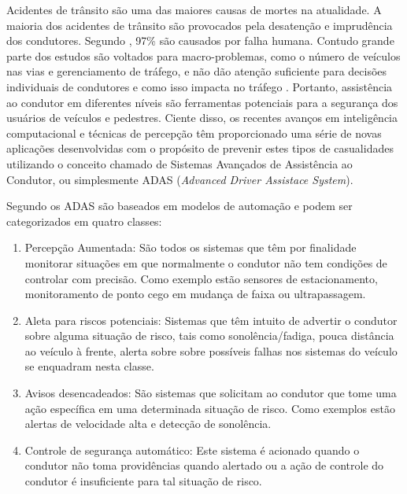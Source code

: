 Acidentes de trânsito são uma das maiores causas de mortes na atualidade. A maioria dos acidentes de trânsito são provocados pela desatenção e imprudência dos condutores. Segundo , 97\% são causados por falha humana. Contudo grande parte dos estudos são voltados para macro-problemas, como o número de veículos nas vias e gerenciamento de tráfego, e não dão atenção suficiente para decisões individuais de condutores e como isso impacta no tráfego \cite{Carmona2015}. 
Portanto, assistência ao condutor em diferentes níveis são ferramentas potenciais para a segurança dos usuários de veículos e pedestres. Ciente disso, os recentes avanços em inteligência computacional e técnicas de percepção têm proporcionado uma série de novas aplicações desenvolvidas com o propósito de prevenir estes tipos de casualidades utilizando o conceito chamado de Sistemas Avançados de Assistência ao Condutor, ou simplesmente ADAS (\textit{Advanced Driver Assistace System}). 

Segundo  os ADAS são baseados em modelos de automação e  podem ser categorizados em quatro classes:

\begin{enumerate}
	\item Percepção Aumentada: São todos os sistemas que têm por finalidade monitorar situações em que normalmente o condutor não tem condições de controlar com precisão. Como exemplo estão sensores de estacionamento, monitoramento de ponto cego em mudança de faixa ou ultrapassagem. 
	
	\item Aleta para riscos potenciais: Sistemas que têm intuito de advertir o condutor sobre alguma situação de risco, tais como sonolência/fadiga, pouca distância ao veículo à frente, alerta sobre sobre possíveis falhas nos sistemas do veículo se enquadram nesta classe.
	
	\item Avisos desencadeados: São sistemas que solicitam ao condutor que tome uma ação específica em uma determinada situação de risco. Como exemplos estão alertas de velocidade alta e detecção de sonolência.
	
	\item Controle de segurança automático: Este sistema é acionado quando o condutor não toma providências quando alertado ou a ação de controle do condutor é insuficiente para tal situação de risco.
	
\end{enumerate}

